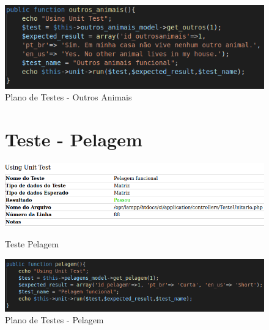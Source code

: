 \begin{apendicesenv}
\begin{figure}[htb]
    \centering
    \caption{\label{fig_timeline}Plano de Testes - Outros Animais}
	\includegraphics[width=1\textwidth]{imagens/cod_teste_outrosanimais.png}
\end{figure}

\begin{figure}[!htbp]
\begin{flushleft}
    \section{Teste - Pelagem}
\end{flushleft}
    \centering
    \caption{Teste Pelagem}
    \includegraphics[width=1\textwidth,pagecommand=\chapter{}]{imagens/teste_pelagem.png}
    \label{teste-pelagem}
\end{figure}

\begin{figure}[htb]
    \centering
    \caption{\label{fig_timeline}Plano de Testes - Pelagem}
	\includegraphics[width=1\textwidth]{imagens/cod_teste_pelagem.png}
\end{figure}


\end{apendicesenv}
